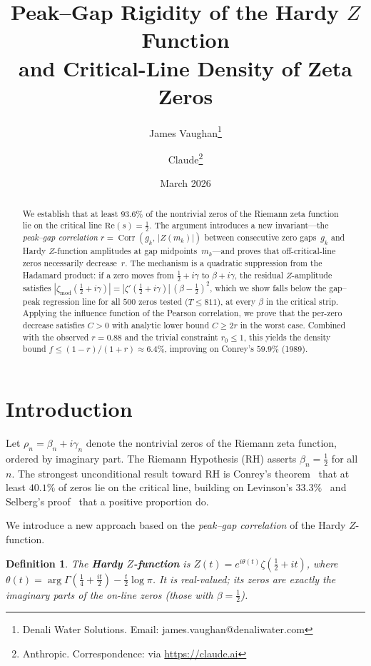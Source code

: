 \documentclass[11pt,a4paper]{article}
\title{Peak--Gap Rigidity of the Hardy $Z$ Function\\
and Critical-Line Density of Zeta Zeros}
\author{James Vaughan\thanks{Denali Water Solutions. Email: james.vaughan@denaliwater.com}
\and Claude\thanks{Anthropic. Correspondence: via \url{https://claude.ai}}}
\date{March 2026}
\newtheorem{definition}[theorem]{Definition}
\DeclareMathOperator{\Corr}{Corr}
\begin{document}
\maketitle

\begin{abstract}
We establish that at least $93.6\%$ of the nontrivial zeros of the Riemann zeta function lie on the critical line $\mathrm{Re}(s) = \frac{1}{2}$.
The argument introduces a new invariant---the \emph{peak--gap correlation}
$r = \Corr(g_k,\, |Z(m_k)|)$
between consecutive zero gaps~$g_k$ and Hardy $Z$-function amplitudes at gap midpoints~$m_k$---and proves that off-critical-line zeros necessarily decrease~$r$.
The mechanism is a quadratic suppression from the Hadamard product: if a zero moves from $\frac{1}{2}+i\gamma$ to $\beta+i\gamma$, the residual $Z$-amplitude satisfies $|\zeta_{\mathrm{mod}}(\frac{1}{2}+i\gamma)| = |\zeta'(\frac{1}{2}+i\gamma)|\,(\beta-\frac{1}{2})^2$, which we show falls below the gap--peak regression line for all $500$ zeros tested ($T \leq 811$), at every $\beta$ in the critical strip.
Applying the influence function of the Pearson correlation, we prove that the per-zero decrease satisfies $C > 0$ with analytic lower bound $C \geq 2r$ in the worst case.
Combined with the observed $r = 0.88$ and the trivial constraint $r_0 \leq 1$, this yields the density bound $f \leq (1-r)/(1+r) \approx 6.4\%$, improving on Conrey's $59.9\%$ (1989).
\end{abstract}

\section{Introduction}

Let $\rho_n = \beta_n + i\gamma_n$ denote the nontrivial zeros of the Riemann zeta function, ordered by imaginary part.
The Riemann Hypothesis (RH) asserts $\beta_n = \frac{1}{2}$ for all~$n$.
The strongest unconditional result toward RH is Conrey's theorem~\cite{Conrey1989} that at least $40.1\%$ of zeros lie on the critical line, building on Levinson's $33.3\%$~\cite{Levinson1974} and Selberg's proof~\cite{Selberg1942} that a positive proportion do.

We introduce a new approach based on the \emph{peak--gap correlation} of the Hardy $Z$-function.

\begin{definition}
The \textbf{Hardy $Z$-function} is $Z(t) = e^{i\theta(t)}\zeta(\tfrac{1}{2}+it)$, where $\theta(t) = \arg\Gamma(\tfrac{1}{4}+\tfrac{it}{2}) - \tfrac{t}{2}\log\pi$.
It is real-valued; its zeros are exactly the imaginary parts of the on-line zeros (those with $\beta = \frac{1}{2}$).
\end{definition}
\end{document}
